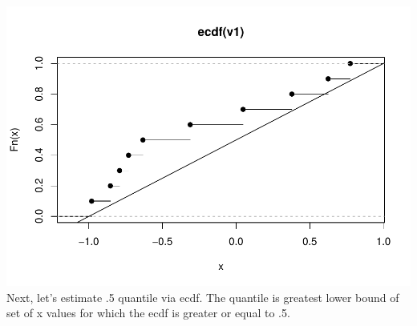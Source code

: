 \documentclass[
]{article}
\begin{document}
\includegraphics[width=1\linewidth,height=0.5\textheight]{R_Tricks_For_ComputationStats_files/figure-latex/unnamed-chunk-4-1}
Next, let's estimate .5 quantile via ecdf. The quantile is greatest
lower bound of set of x values for which the ecdf is greater or equal to
.5.
\end{document}
